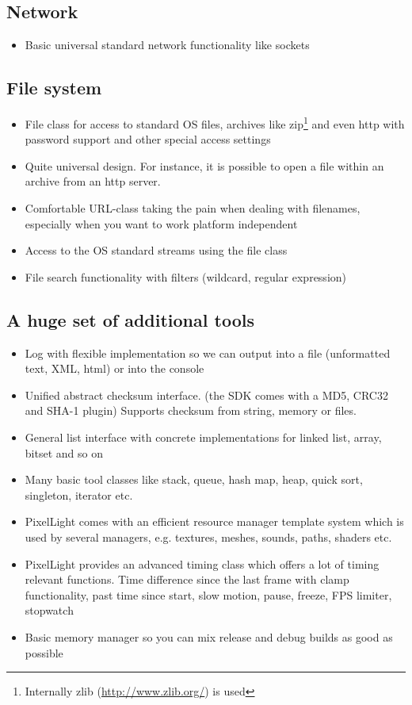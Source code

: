 \subsection{Network}
\begin{itemize}
\item{Basic universal standard network functionality like sockets}
\end{itemize}


\subsection{File system}
\begin{itemize}
\item{File class for access to standard OS files, archives like zip\footnote{Internally zlib (\url{http://www.zlib.org/}) is used} and even http with password support and other special access settings}
\item{Quite universal design. For instance, it is possible to open a file within an archive from an http server.}
\item{Comfortable URL-class taking the pain when dealing with filenames, especially when you want to work platform independent}
\item{Access to the OS standard streams using the file class}
\item{File search functionality with filters (wildcard, regular expression)}
\end{itemize}


\subsection{A huge set of additional tools}
\begin{itemize}
\item{Log with flexible implementation so we can output into a file (unformatted text, XML, html) or into the console}
\item{Unified abstract checksum interface. (the SDK comes with a MD5, CRC32 and SHA-1 plugin) Supports checksum from string, memory or files.}
\item{General list interface with concrete implementations for linked list, array, bitset and so on}
\item{Many basic tool classes like stack, queue, hash map, heap, quick sort, singleton, iterator etc.}
\item{PixelLight comes with an efficient resource manager template system which is used by several managers, e.g. textures, meshes, sounds, paths, shaders etc. }
\item{PixelLight provides an advanced timing class which offers a lot of timing relevant functions. Time difference since the last frame with clamp functionality, past time since start, slow motion, pause, freeze, FPS limiter, stopwatch}
\item{Basic memory manager so you can mix release and debug builds as good as possible}
\end{itemize}




